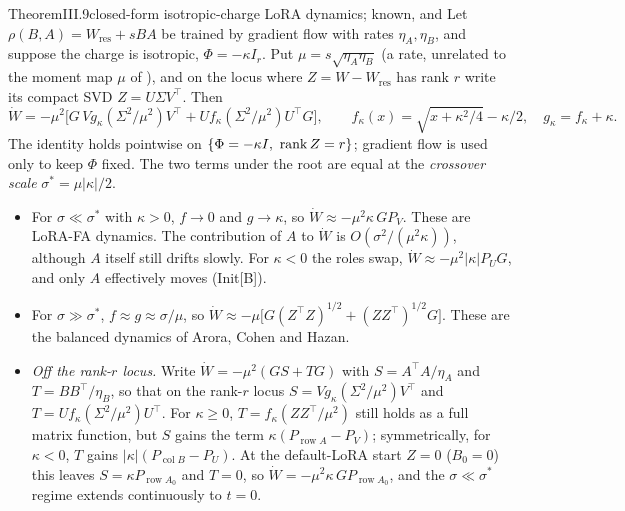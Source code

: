\begin{restate}{Theorem}{III.9}{closed-form isotropic-charge LoRA dynamics; known, \citet{xtarmoun2021understanding} and \citet{xmin2021explicit}}
Let $\rho(B,A)=W_{\mathrm{res}}+sBA$ be trained by gradient flow with rates $\eta_A,\eta_B$, and suppose the charge is
isotropic, $\Phi=-\kappa I_r$. Put $\mu=s\sqrt{\eta_A\eta_B}$ (a rate, unrelated to the moment map $\mu$ of
), and on the locus where $Z=W-W_{\mathrm{res}}$ has rank $r$ write its compact SVD
$Z=U\Sigma V^\top$. Then
\[\dot W=-\mu^2\big[G\,V g_\kappa(\Sigma^2/\mu^2)V^\top+U f_\kappa(\Sigma^2/\mu^2)U^\top G\big],\qquad
f_\kappa(x)=\sqrt{x+\kappa^2/4}-\kappa/2,\quad g_\kappa=f_\kappa+\kappa .\]
The identity holds pointwise on $\{\Phi=-\kappa I,\ \operatorname{rank} Z=r\}$; gradient flow is used only to keep $\Phi$ fixed. The two
terms under the root are equal at the \emph{crossover scale} $\sigma^*=\mu\lvert\kappa\rvert/2$.
\begin{itemize}
\item For $\sigma\ll\sigma^*$ with $\kappa>0$, $f\to0$ and $g\to\kappa$, so $\dot W\approx-\mu^2\kappa\,GP_V$. These are
LoRA-FA dynamics. The contribution of $A$ to $\dot W$ is $O(\sigma^2/(\mu^2\kappa))$, although $A$ itself still drifts
slowly. For $\kappa<0$ the roles swap, $\dot W\approx-\mu^2\lvert\kappa\rvert P_UG$, and only $A$ effectively moves
(Init[B]).
\item For $\sigma\gg\sigma^*$, $f\approx g\approx\sigma/\mu$, so $\dot W\approx-\mu\big[G(Z^\top Z)^{1/2}+(ZZ^\top)^{1/2}G\big]$.
These are the balanced dynamics of Arora, Cohen and Hazan.
\item \emph{Off the rank-$r$ locus.} Write $\dot W=-\mu^2(GS+TG)$ with $S=A^\top A/\eta_A$ and $T=BB^\top/\eta_B$, so that
on the rank-$r$ locus $S=Vg_\kappa(\Sigma^2/\mu^2)V^\top$ and $T=Uf_\kappa(\Sigma^2/\mu^2)U^\top$. For $\kappa\ge0$,
$T=f_\kappa(ZZ^\top/\mu^2)$ still holds as a full matrix function, but $S$ gains the term
$\kappa(P_{\operatorname{row}A}-P_V)$; symmetrically, for $\kappa<0$, $T$ gains $\lvert\kappa\rvert(P_{\operatorname{col}B}-P_U)$.
At the default-LoRA start $Z=0$ ($B_0=0$) this leaves $S=\kappa P_{\operatorname{row}A_0}$ and $T=0$, so
$\dot W=-\mu^2\kappa\,GP_{\operatorname{row}A_0}$, and the $\sigma\ll\sigma^*$ regime extends continuously to $t=0$.
\end{itemize}
\end{restate}

